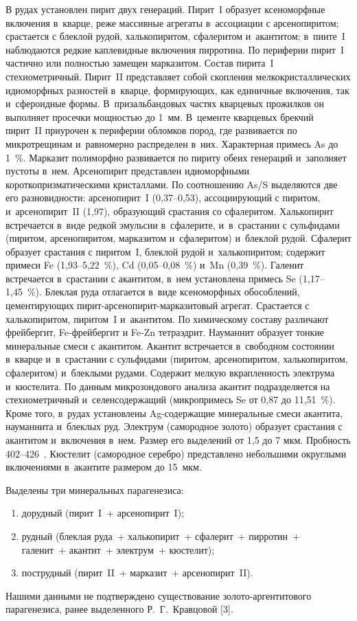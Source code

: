 В рудах установлен пирит двух генераций. Пирит~I образует ксеноморфные включения в~кварце, реже массивные агрегаты в~ассоциации с арсенопиритом; срастается с блеклой рудой, халькопиритом, сфалеритом и~акантитом; в~пиите~I наблюдаются редкие каплевидные включения пирротина. По периферии пирит~I частично или полностью замещен марказитом. Состав пирита~I стехиометричный. Пирит~II представляет собой скопления мелкокристаллических идиоморфных разностей в~кварце, формирующих, как единичные включения, так и~сфероидные формы. В~призальбандовых частях кварцевых прожилков он выполняет просечки мощностью до 1~мм. В~цементе кварцевых брекчий пирит~II приурочен к периферии обломков пород, где развивается по микротрещинам и~равномерно распределен в~них. Характерная примесь As до 1~\%. Марказит полиморфно развивается по пириту обеих генераций и~заполняет пустоты в~нем. Арсенопирит представлен идиоморфными короткопризматическими кристаллами. По соотношению As/S выделяются две его разновидности: арсенопирит~I (0,37--0,53), ассоциирующий с пиритом, и~арсенопирит~II (1,97), образующий срастания со сфалеритом. Халькопирит встречается в~виде редкой эмульсии в~сфалерите, и~в~срастании с сульфидами (пиритом, арсенопиритом, марказитом и~сфалеритом) и~блеклой рудой. Сфалерит образует срастания с пиритом~I, блеклой рудой и~халькопиритом; содержит примеси Fe (1,93--5,22~\%), Cd (0,05--0,08~\%) и~Mn (0,39~\%). Галенит встречается в~срастании с акантитом, в~нем установлена примесь Se (1,17--1,45~\%). Блеклая руда отлагается в~виде ксеноморфных обособлений, цементирующих пирит-арсенопирит-марказитовый агрегат. Срастается с халькопиритом, пиритом~I и~акантитом. По химическому составу различают фрейбергит, Fe-фрейбергит и Fe-Zn тетраэдрит. Науманнит образует тонкие минеральные смеси с акантитом. Акантит встречается в~свободном состоянии в~кварце и~в~срастании с сульфидами (пиритом, арсенопиритом, халькопиритом, сфалеритом) и~блеклыми рудами. Содержит мелкую вкрапленность электрума и~кюстелита. По данным микрозондового анализа акантит подразделяется на стехиометричный и~селенсодержащий (микропримесь Se от 0,87 до 11,51~\%). Кроме того, в~рудах установлены Ag-содержащие минеральные смеси акантита, науманнита и~блеклых руд. Электрум (самородное золото) образует срастания с акантитом и~включения в~нем. Размер его выделений от 1,5 до 7 мкм. Пробность 402--426~\permil. Кюстелит (самородное серебро) представлено небольшими округлыми включениями в~акантите размером до 15~мкм.

Выделены три минеральных парагенезиса:
\begin{enumerate}[noitemsep]\vspace{-8pt}
  \item дорудный (пирит~I~+ арсенопирит~I);
  \item рудный (блеклая руда~+ халькопирит~+ сфалерит~+ пирротин~+\\галенит~+ акантит~+ электрум~+ кюстелит);
  \item пострудный (пирит~II~+ марказит~+ арсенопирит~II).
\end{enumerate}
 \vspace{-8pt}Нашими данными не подтверждено существование золото-аргентитового парагенезиса, ранее выделенного Р.~Г.~Кравцовой [3].

